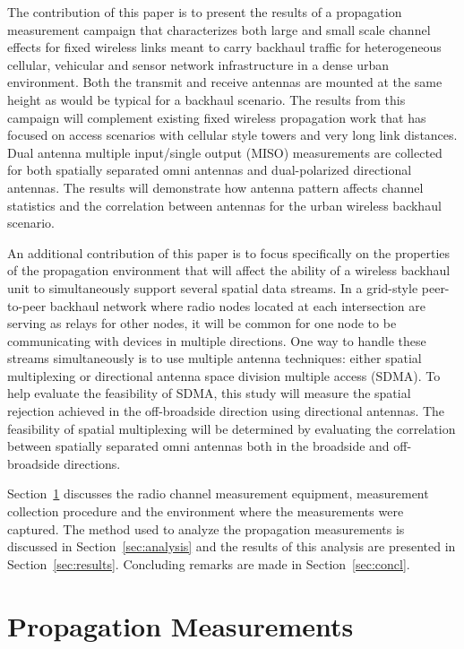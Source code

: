 \documentclass[12pt]{IEEEtran}
\begin{document}
The contribution of this paper is to present the results of a propagation measurement campaign that characterizes both large and small scale channel effects for fixed wireless links meant to carry backhaul traffic for heterogeneous cellular, vehicular and sensor network infrastructure in a dense urban environment.  Both the transmit and receive antennas are mounted at the same height as would be typical for a backhaul scenario.  The results from this campaign will complement existing fixed wireless propagation work that has focused on access scenarios with cellular style towers and very long link distances.  Dual antenna multiple input/single output (MISO)  measurements are collected for both spatially separated omni antennas and dual-polarized directional antennas.  The results will demonstrate how antenna pattern affects channel statistics and the correlation between antennas for the urban wireless backhaul scenario.

An additional contribution of this paper is to focus specifically on the properties of the propagation environment that will affect the ability of a wireless backhaul unit to simultaneously support several spatial data streams.  In a grid-style peer-to-peer backhaul network where radio nodes located at each intersection are serving as relays for other nodes, it will be common for one node to be communicating with devices in  multiple directions.  One way to handle these streams simultaneously is to use multiple antenna techniques: either spatial multiplexing or directional antenna space division multiple access (SDMA).  To help evaluate the feasibility of SDMA, this study will measure the spatial rejection achieved in the off-broadside direction using directional antennas.  The feasibility of spatial multiplexing will be determined by evaluating the correlation between spatially separated omni antennas both in the broadside and off-broadside directions.

Section~\ref{sec:meas} discusses the radio channel measurement equipment, measurement collection procedure and the environment where the measurements were captured.  The method used to analyze the propagation measurements is discussed in Section~\ref{sec:analysis} and the results of this analysis are presented in Section~\ref{sec:results}. Concluding remarks are made in Section~\ref{sec:concl}.


\section{Propagation Measurements}
\label{sec:meas}
\end{document}
